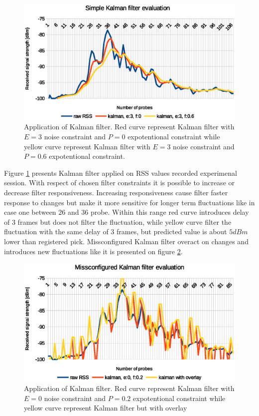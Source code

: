 \documentclass[../main.tex]{subfiles}
\begin{document}
\begin{figure}[!htbp]
\includegraphics[width=\textwidth]{pictures/filtering_simple_kalman}
\centering
\caption{Application of Kalman filter. Red curve represent Kalman filter with $E=3$ noise constraint and $P=0$ expotentional constraint while yellow curve represent Kalman filter with $E=3$ noise constraint and $P=0.6$ expotentional constraint. }
\label{fig:filtering_simple_kalman}
\end{figure}

Figure \ref{fig:filtering_simple_kalman} presents Kalman filter applied on RSS values recorded experimenal session. With respect of chosen filter constraints it is possible to increase or decrease filter responsiveness. Increasing responsiveness cause filter faster response to changes but make it more sensitive for longer term fluctuations like in case one between $26$ and $36$ probe. Within this range red curve introduces delay of $3$ frames but does not filter the fluctuation, while yellow curve filter the fluctuation with the same delay of $3$ frames, but predicted value is about $5dBm$ lower than registered pick. Missconfigured Kalman filter overact on changes and introduces new fluctuations like it is presented on figure \ref{fig:filtering_simple_kalman_missconfigured}.

\begin{figure}[!htbp]
\includegraphics[width=\textwidth]{pictures/filtering_simple_kalman_missconfigured}
\centering
\caption{Application of Kalman filter. Red curve represent Kalman filter with $E=0$ noise constraint and $P=0.2$ expotentional constraint while yellow curve represent Kalman filter but with overlay }
\label{fig:filtering_simple_kalman_missconfigured}
\end{figure}
\end{document}
